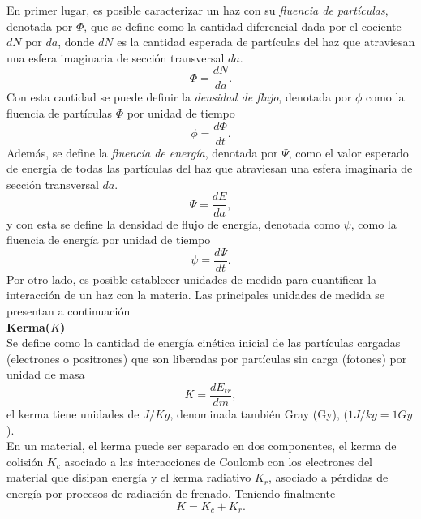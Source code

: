 En primer lugar, es posible caracterizar un haz con su \textit{fluencia de partículas}, denotada por $\Phi $, que se define como la cantidad diferencial dada por el cociente $dN$ por $da$, donde $dN$ es la cantidad esperada de partículas del haz que atraviesan una esfera imaginaria de sección transversal $da$.
\begin{equation}
\Phi=\frac{dN}{da}.
\end{equation}   
Con esta cantidad se puede definir la \textit{densidad de flujo}, denotada por $\phi$ como la fluencia de partículas $\Phi$ por unidad de tiempo
\begin{equation}
\phi=\frac{d\Phi}{dt}.
\end{equation}
Además, se define la \textit{fluencia de energía}, denotada por $\Psi$, como el valor esperado de energía de todas las partículas del haz que atraviesan una esfera imaginaria de sección transversal $da$.
\begin{equation}
\Psi=\frac{dE}{da},
\end{equation}
y con esta se define la densidad de flujo de energía, denotada como $\psi$, como la fluencia de energía por unidad de tiempo
\begin{equation}
\psi=\frac{d\Psi}{dt}.
\end{equation}
Por otro lado, es posible establecer unidades de medida para cuantificar la interacción de un haz con la materia. Las principales unidades de medida se presentan a continuación\\

\noindent
\textbf{Kerma($K$)}\\

Se define como la cantidad de energía cinética inicial de las partículas cargadas (electrones o positrones) que son liberadas por partículas sin carga (fotones) por unidad de masa
\begin{equation}
K=\frac{dE_{tr}}{dm},
\end{equation}
el kerma tiene unidades de $J/Kg$, denominada también Gray (Gy), ($1J/kg=1Gy$).\\


En un material, el kerma puede ser separado en dos componentes, el kerma de colisión $K_c$  asociado a las interacciones de Coulomb con los electrones del material que disipan energía y el kerma radiativo $K_r$, asociado a pérdidas de energía por procesos de radiación de frenado. Teniendo finalmente 
\begin{equation}
	K=K_c+K_r.
\end{equation}\\

